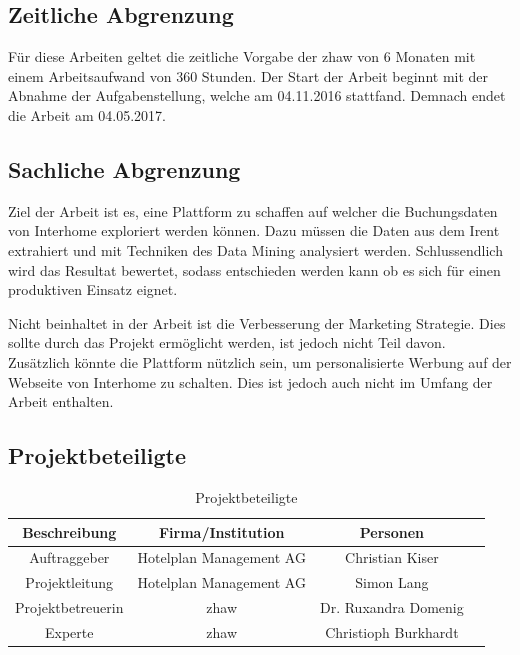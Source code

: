 \subsection{Zeitliche Abgrenzung}
Für diese Arbeiten geltet die zeitliche Vorgabe der \gls{zhaw} von 6 Monaten mit einem Arbeitsaufwand von 360 Stunden.
Der Start der Arbeit beginnt mit der Abnahme der Aufgabenstellung, welche am 04.11.2016 stattfand.
Demnach endet die Arbeit am 04.05.2017.

\subsection{Sachliche Abgrenzung}
Ziel der Arbeit ist es, eine Plattform zu schaffen auf welcher die Buchungsdaten von Interhome exploriert werden können. Dazu müssen die Daten aus dem Irent extrahiert und mit Techniken des Data Mining analysiert werden. Schlussendlich wird das Resultat bewertet, sodass entschieden werden kann ob es sich für einen produktiven Einsatz eignet.

Nicht beinhaltet in der Arbeit ist die Verbesserung der Marketing Strategie. Dies sollte durch das Projekt ermöglicht werden, ist jedoch nicht Teil davon. Zusätzlich könnte die Plattform nützlich sein, um personalisierte Werbung auf der Webseite von Interhome zu schalten. Dies ist jedoch auch nicht im Umfang der Arbeit enthalten.

\subsection{Projektbeteiligte}
\begin{table}[H] 
	\caption{Projektbeteiligte}
	\centering
	
	\begin{tabular}{ | c | c | c | c |} 
		\hline 
		\rowcolor{tableheadcolor}
		\bfseries Beschreibung & 
		\bfseries Firma/Institution & 
		\bfseries Personen \\ \hline 
		Auftraggeber & Hotelplan Management AG & Christian Kiser \\ \hline 
		Projektleitung & Hotelplan Management AG & Simon Lang\\ \hline 
		Projektbetreuerin &  \gls{zhaw} & Dr. Ruxandra Domenig \\ \hline 
		Experte & \gls{zhaw} & Christioph Burkhardt \\ \hline 
	\end{tabular} 
\end{table}

